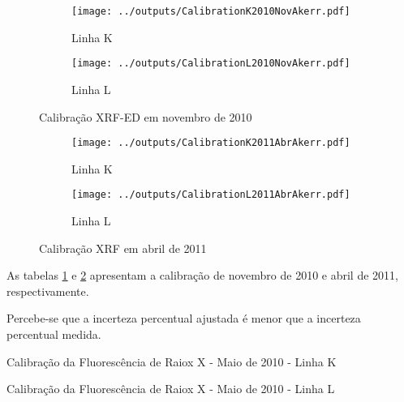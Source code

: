 \begin{figure}[H]
  \begin{subfigure}[b]{0.5\textwidth}
   \texttt{[image: ../outputs/CalibrationK2010NovAkerr.pdf]}
    \caption{Linha K}
  \end{subfigure}
  \begin{subfigure}[b]{0.5\textwidth}
    \texttt{[image: ../outputs/CalibrationL2010NovAkerr.pdf]}
    \caption{Linha L}
  \end{subfigure}
  \caption{Calibração XRF-ED em novembro de 2010 \label{fig:edx_calib_KLnov2010}}
\end{figure}

\newpage
\begin{figure}[H]
  \begin{subfigure}[b]{0.5\textwidth}
    \texttt{[image: ../outputs/CalibrationK2011AbrAkerr.pdf]}
    \caption{Linha K}
  \end{subfigure}
  \begin{subfigure}[b]{0.5\textwidth}
    \texttt{[image: ../outputs/CalibrationL2011AbrAkerr.pdf]}
    \caption{Linha L}
  \end{subfigure}
\caption{Calibração XRF em  abril de 2011 \label{fig:edx_calib_KLabr2011}}
\end{figure}

As tabelas \ref{fig:edx_calib_KLnov2010} e \ref{fig:edx_calib_KLabr2011}
apresentam a calibração de novembro de 2010 e abril de 2011, respectivamente.
 
Percebe-se que a incerteza percentual ajustada é menor que 
a incerteza percentual medida. 

\begin{table}[H]
  \centering
  \begin{scriptsize} 
    
  \end{scriptsize}
  \caption{Calibração da Fluorescência de Raiox X - Maio de 2010 - Linha K
  \label{table:edx_calib_Kmaio2010}}
\end{table}

\begin{table}[H]
  \centering
  \begin{scriptsize} 
    
  \end{scriptsize}
  \caption{Calibração da Fluorescência de Raiox X - Maio de 2010 - Linha L 
  \label{table:edx_calib_Lmaio2010}}
\end{table}

